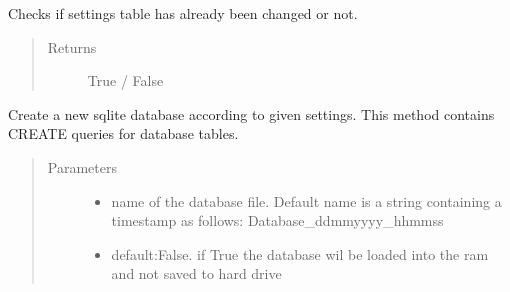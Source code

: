 \documentclass[letterpaper,10pt,english]{sphinxmanual}
\begin{document}
\begin{fulllineitems}
\begin{fulllineitems}
\begin{quote}
\begin{description}
\begin{itemize}
\end{itemize}

\end{description}\end{quote}

\end{fulllineitems}


\begin{fulllineitems}
\label{\detokenize{api:beamon.database.database.Database.is_settings_preset}}
Checks if settings table has already been changed or not.
\begin{quote}\begin{description}
\item[{Returns}] \leavevmode
True / False

\end{description}\end{quote}

\end{fulllineitems}


\begin{fulllineitems}
\label{\detokenize{api:beamon.database.database.Database.make_dummy_file}}
Create a new sqlite database according to given settings. This method contains CREATE queries for database
tables.
\begin{quote}\begin{description}
\item[{Parameters}] \leavevmode\begin{itemize}
\item {} 
 \textendash{} name of the database file. Default name is a string containing a timestamp as follows:
Database\_dd\sphinxhyphen{}mm\sphinxhyphen{}yyyy\_hh\sphinxhyphen{}mm\sphinxhyphen{}ss

\item {} 
 \textendash{} default:False. if True the database wil be loaded into the ram and not saved to hard drive


\end{itemize}
\end{description}
\end{quote}
\end{fulllineitems}
\end{fulllineitems}
\end{document}
